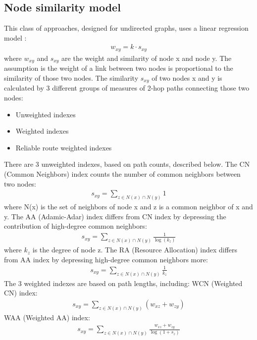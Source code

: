 \documentclass[letterpaper]{article}
\begin{document}
\subsection{Node similarity model}
This class of approaches, designed for undirected graphs,
uses a linear regression model \cite{zhao2015prediction}:
\begin{align*}
	w_{xy} = k \cdot s_{xy}
\end{align*}
where $ w_{xy} $ and $ s_{xy} $ are the weight and similarity of node x and node y.
The assumption is the weight of a link between two nodes 
is proportional to the similarity of those two nodes.
The similarity $ s_{xy} $ of two nodes x and y is calculated by 3 different groups of measures of 2-hop paths connecting those two nodes:
\begin{itemize}
	\item Unweighted indexes \cite{adamic2003friends}
	\item Weighted indexes \cite{murata2007link}
	\item Reliable route weighted indexes \cite{taha1982operations}
\end{itemize}
There are 3 unweighted indexes, based on path counts, described below.
The CN (Common Neighbors) index counts the number of common neighbors between two nodes:
\begin{align*}
	s_{xy} = \sum_{z \in N(x) \cap N(y)} 1
\end{align*}
where N(x) is the set of neighbors of node x and z is a common neighbor of x and y.
The AA (Adamic-Adar) index differs from CN index by depressing the contribution of high-degree common neighbors:
\begin{align*}
	s_{xy} = \sum_{z \in N(x) \cap N(y)} \frac{1}{\log(k_z)}
\end{align*}
where $ k_z $ is the degree of node z.
The RA (Resource Allocation) index differs from AA index
by depressing high-degree common neighbors more:
\begin{align*}
	s_{xy} = \sum_{z \in N(x) \cap N(y)} \frac{1}{k_z}
\end{align*}
The 3 weighted indexes are based on path lengths, including:
WCN (Weighted CN) index:
\begin{align*}
	s_{xy} = \sum_{z \in N(x) \cap N(y)} (w_{xz} + w_{zy})
\end{align*}
WAA (Weighted AA) index:
\begin{align*}
	s_{xy} = \sum_{z \in N(x) \cap N(y)} \frac{w_{xz} + w_{zy}}{\log(1 + s_z)}
\end{align*}
\end{document}
